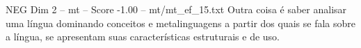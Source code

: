 \begin{textsample}{NEG Dim 2 – mt – Score -1.00 – mt/mt\_ef\_15.txt}
Outra coisa é saber analisar uma língua dominando conceitos e metalinguagens a partir dos quais se fala sobre a língua, se apresentam suas características estruturais e de uso.

\end{textsample}
